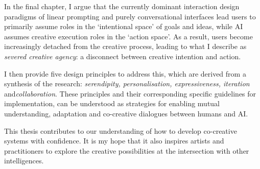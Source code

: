In the final chapter, I argue that the currently dominant interaction design paradigms of linear prompting and purely conversational interfaces lead users to primarily assume roles in the `intentional space' of goals and ideas, while AI assumes creative execution roles in the `action space'. As a result, users become increasingly detached from the creative process, leading to what I describe as \textit{severed creative agency}: a disconnect between creative intention and action. 

I then provide five design principles to address this, which are derived from a synthesis of the research: \textit{serendipity, personalisation, expressiveness, iteration }and\textit{collaboration}. These principles and their corresponding specific guidelines for implementation, can be understood as strategies for enabling mutual understanding, adaptation and co-creative dialogues between humans and AI. 

This thesis contributes to our understanding of how to develop co-creative systems with confidence. It is my hope that it also inspires artists and practitioners to explore the creative possibilities at the intersection with other intelligences.
